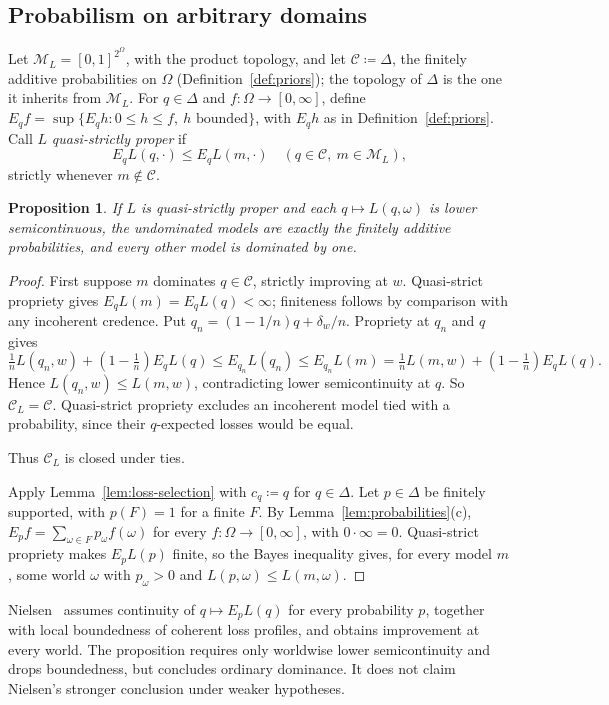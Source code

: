 \documentclass[11pt]{article}
\newtheorem{proposition}[theorem]{Proposition}
\theoremstyle{definition}
\theoremstyle{remark}
\newcommand{\M}{\mathcal M}
\newcommand{\C}{\mathcal C}
\begin{document}
\subsection{Probabilism on arbitrary domains}
Let $\M_L=[0,1]^{2^\Omega}$, with the product topology, and let {\color{red}$\C\coloneqq\Delta$, the finitely additive probabilities on $\Omega$ (Definition~\ref{def:priors}); the topology of $\Delta$ is the one it inherits from $\M_L$. For $q\in\Delta$ and $f:\Omega\to[0,\infty]$,} define $E_qf=\sup\{E_qh:0\le h\le f,\ h\text{ bounded}\}$, {\color{red}with $E_qh$ as in Definition~\ref{def:priors}}. Call $L$ \emph{quasi-strictly proper} if
\[
E_qL(q,\cdot)\le E_qL(m,\cdot)\quad(q\in\C,\ m\in\M_L),
\]
strictly whenever $m\notin\C$.
\begin{proposition}\label{prop:short-infinite}
If $L$ is quasi-strictly proper and each $q\mapsto L(q,\omega)$ is lower semicontinuous, the undominated models are exactly the finitely additive probabilities, and every other model is dominated by one.
\end{proposition}
\begin{proof}
First suppose $m$ dominates $q\in\C$, strictly improving at $w$. Quasi-strict propriety gives $E_qL(m)=E_qL(q)<\infty$; finiteness follows by comparison with any incoherent credence. Put $q_n=(1-1/n)q+\delta_w/n$. Propriety at $q_n$ and $q$ gives
\[
\tfrac1nL(q_n,w)+(1-\tfrac1n)E_qL(q)
\le E_{q_n}L(q_n)\le E_{q_n}L(m)
=\tfrac1nL(m,w)+(1-\tfrac1n)E_qL(q).
\]
Hence $L(q_n,w)\le L(m,w)$, contradicting lower semicontinuity at $q$. So $\C_L=\C$. Quasi-strict propriety excludes an incoherent model tied with a probability, since their $q$-expected losses would be equal. {\color{red}Thus $\C_L$ is closed under ties.

Apply Lemma~\ref{lem:loss-selection} with $c_q\coloneqq q$ for $q\in\Delta$. Let $p\in\Delta$ be finitely supported, with $p(F)=1$ for a finite $F$. By Lemma~\ref{lem:probabilities}(c), $E_pf=\sum_{\omega\in F}p_\omega f(\omega)$ for every $f:\Omega\to[0,\infty]$, with $0\cdot\infty=0$. Quasi-strict propriety makes $E_pL(p)$ finite, so the Bayes inequality gives, for every model $m$, some world $\omega$ with $p_\omega>0$ and $L(p,\omega)\le L(m,\omega)$.}
\end{proof}
Nielsen~\cite{Nielsen2023} assumes continuity of $q\mapsto E_pL(q)$ for every probability $p$, together with local boundedness of coherent loss profiles, and obtains improvement at every world. The proposition requires only worldwise lower semicontinuity and drops boundedness, but concludes ordinary dominance. It does not claim Nielsen's stronger conclusion under weaker hypotheses.
\end{document}
